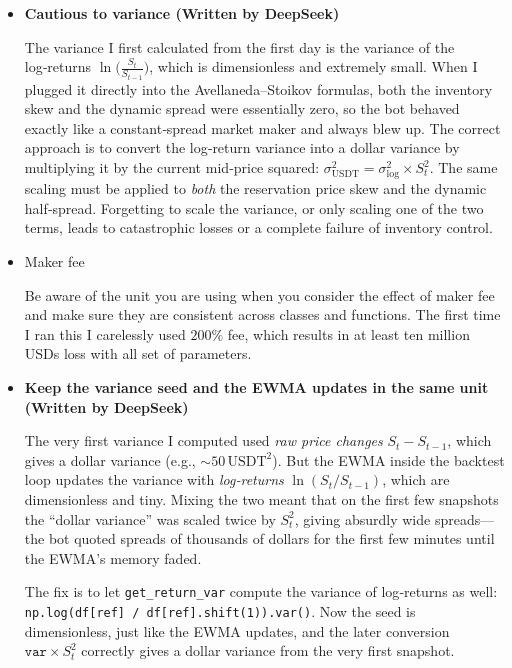 \documentclass[11pt,a4paper]{article}
\begin{document}
\begin{itemize}
    \item \textbf{Cautious to variance (Written by DeepSeek)}

    The variance I first calculated from the first day is the variance of the
    log‑returns \(\ln\!\bigl(\frac{S_t}{S_{t-1}}\bigr)\), which is dimensionless and
    extremely small.  When I plugged it directly into the Avellaneda–Stoikov
    formulas, both the inventory skew and the dynamic spread were essentially zero,
    so the bot behaved exactly like a constant‑spread market maker and always
    blew up.  The correct approach is to convert the log‑return variance into a
    dollar variance by multiplying it by the current mid‑price squared:
    \(\sigma^2_{\text{USDT}} = \sigma^2_{\text{log}} \times S_t^2\).
    The same scaling must be applied to \emph{both} the reservation price skew
    and the dynamic half‑spread.  Forgetting to scale the variance, or only
    scaling one of the two terms, leads to catastrophic losses or a complete
    failure of inventory control.

    \item Maker fee

    Be aware of the unit you are using when you consider the effect of maker fee and make sure they are consistent across classes and functions. The first time I ran this I carelessly used \(200 \%\) fee, which results in at least ten million USDs loss with all set of parameters.

    \item \textbf{Keep the variance seed and the EWMA updates in the same unit (Written by DeepSeek)}

    The very first variance I computed used \emph{raw price changes}
    \(S_t - S_{t-1}\), which gives a dollar variance (e.g., \(\sim 50\,\text{USDT}^2\)).
    But the EWMA inside the backtest loop updates the variance with
    \emph{log‑returns} \(\ln(S_t / S_{t-1})\), which are dimensionless and tiny.
    Mixing the two meant that on the first few snapshots the “dollar variance” was
    scaled twice by \(S_t^2\), giving absurdly wide spreads—the bot quoted spreads
    of thousands of dollars for the first few minutes until the EWMA’s memory faded.

    The fix is to let \texttt{get\_return\_var} compute the variance of log‑returns
    as well:
    \texttt{np.log(df[ref] / df[ref].shift(1)).var()}.
    Now the seed is dimensionless, just like the EWMA updates, and the later
    conversion \(\texttt{var} \times S_t^2\) correctly gives a dollar variance from
    the very first snapshot.
\end{itemize}
\end{document}
